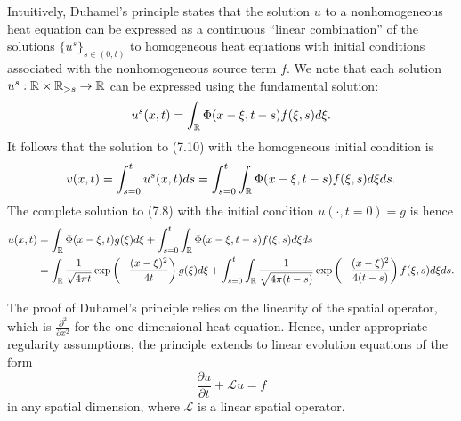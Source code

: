 Intuitively, Duhamel's principle states that the solution $u$ to a nonhomogeneous heat equation can be expressed as a continuous ``linear combination'' of the solutions $\{u^s\}_{s \in (0,t)}$ to homogeneous heat equations with initial conditions associated with the nonhomogeneous source term $f$. We note that each solution $u^s : \mathbb{R} \times \mathbb{R}_{>s} \to \mathbb{R}$ can be expressed using the fundamental solution:
\[u^s(x, t) = \int_{\mathbb{R}} \Phi(x - \xi, t - s) f(\xi, s) d\xi.\]
It follows that the solution to (7.10) with the homogeneous initial condition is
\[v(x, t) = \int_{s=0}^{t} u^s(x, t) ds = \int_{s=0}^{t} \int_{\mathbb{R}} \Phi(x - \xi, t - s) f(\xi, s) d\xi ds.\]
The complete solution to (7.8) with the initial condition $u(\cdot, t = 0) = g$ is hence
\begin{align*}
    u(x, t) &= \int_{\mathbb{R}} \Phi(x - \xi, t) g(\xi) d\xi + \int_{s=0}^{t} \int_{\mathbb{R}} \Phi(x - \xi, t - s) f(\xi, s) d\xi ds \\
    &= \int_{\mathbb{R}} \frac{1}{\sqrt{4\pi t}} \exp\left(-\frac{(x - \xi)^2}{4t}\right) g(\xi) d\xi + \int_{s=0}^{t} \int_{\mathbb{R}} \frac{1}{\sqrt{4\pi(t - s)}} \exp\left(-\frac{(x - \xi)^2}{4(t - s)}\right) f(\xi, s) d\xi ds.
\end{align*}

\begin{nremark}[][7.11]
    The proof of Duhamel's principle relies on the linearity of the spatial operator, which is $\frac{\partial^2}{\partial x^2}$ for the one-dimensional heat equation. Hence, under appropriate regularity assumptions, the principle extends to linear evolution equations of the form
    \[\frac{\partial u}{\partial t} + \mathcal{L} u = f\]
    in any spatial dimension, where $\mathcal{L}$ is a linear spatial operator.
\end{nremark}

